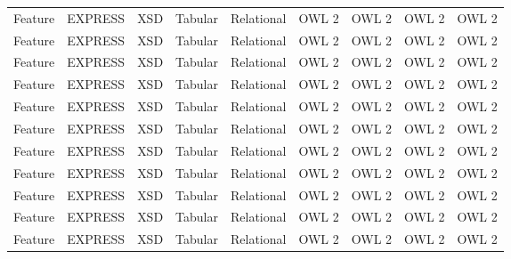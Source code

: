 \begin{table*}[t]
\begin{tabularx}{\textwidth}{XXXXXXXXX}
            Feature & EXPRESS   &   XSD &  Tabular  & Relational    &   OWL 2  & OWL 2 &    OWL 2   &   OWL 2 \\
            Feature & EXPRESS   &   XSD &  Tabular  & Relational    &   OWL 2  & OWL 2 &    OWL 2   &   OWL 2 \\
            Feature & EXPRESS   &   XSD &  Tabular  & Relational    &   OWL 2  & OWL 2 &    OWL 2   &   OWL 2 \\
            Feature & EXPRESS   &   XSD &  Tabular  & Relational    &   OWL 2  & OWL 2 &    OWL 2   &   OWL 2 \\
            Feature & EXPRESS   &   XSD &  Tabular  & Relational    &   OWL 2  & OWL 2 &    OWL 2   &   OWL 2 \\
            Feature & EXPRESS   &   XSD &  Tabular  & Relational    &   OWL 2  & OWL 2 &    OWL 2   &   OWL 2 \\
            Feature & EXPRESS   &   XSD &  Tabular  & Relational    &   OWL 2  & OWL 2 &    OWL 2   &   OWL 2 \\
            Feature & EXPRESS   &   XSD &  Tabular  & Relational    &   OWL 2  & OWL 2 &    OWL 2   &   OWL 2 \\
            Feature & EXPRESS   &   XSD &  Tabular  & Relational    &   OWL 2  & OWL 2 &    OWL 2   &   OWL 2 \\
            Feature & EXPRESS   &   XSD &  Tabular  & Relational    &   OWL 2  & OWL 2 &    OWL 2   &   OWL 2 \\
            Feature & EXPRESS   &   XSD &  Tabular  & Relational    &   OWL 2  & OWL 2 &    OWL 2   &   OWL 2 \\

        \hline
    \end{tabularx}
\end{table*}
















